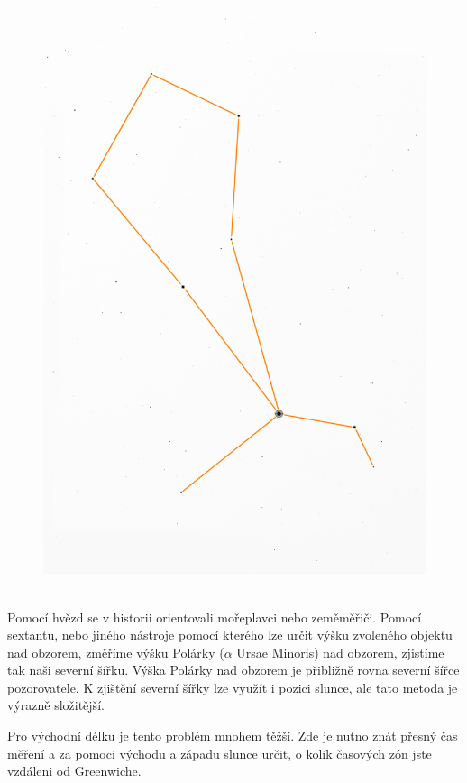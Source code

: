 \documentclass[12pt,a4paper,titlepage]{article}
\begin{document}
\begin{figure}[H]
\begin{minipage}{.45\textwidth}
	  \includegraphics[width=1\linewidth]{2025.png}
	  ~\label{fig:2025}
	\end{minipage}
\end{figure}

Pomocí hvězd se v historii orientovali mořeplavci nebo zeměměřiči. Pomocí sextantu, nebo jiného nástroje pomocí kterého lze určit výšku zvoleného objektu nad obzorem, změříme výšku Polárky ($\alpha$ Ursae Minoris) nad obzorem, zjistíme tak naši severní šířku. Výška Polárky nad obzorem je přibližně rovna severní šířce pozorovatele. K zjištění severní šířky lze využít i pozici slunce, ale tato metoda je výrazně složitější.

Pro východní délku je tento problém mnohem těžší. Zde je nutno znát přesný čas měření a za pomoci východu a západu slunce určit, o kolik časových zón jste vzdáleni od Greenwiche.
\end{document}
